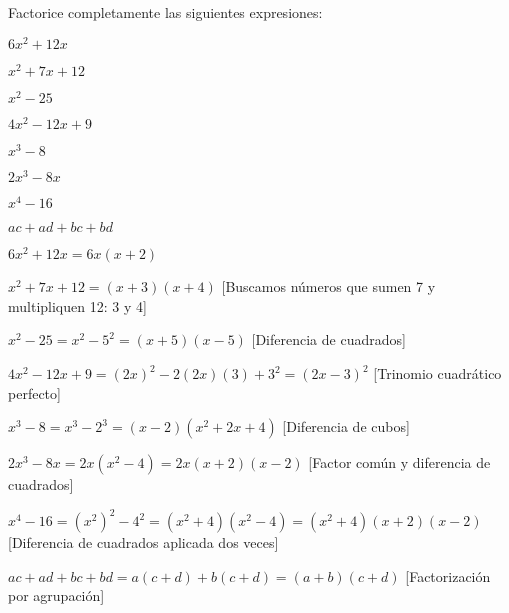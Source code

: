 \begin{exercise}
\problem Factorice completamente las siguientes expresiones:

\begin{exerciselist}
    \item $6x^2 + 12x$
    \item $x^2 + 7x + 12$
    \item $x^2 - 25$
    \item $4x^2 - 12x + 9$
    \item $x^3 - 8$
    \item $2x^3 - 8x$
    \item $x^4 - 16$
    \item $ac + ad + bc + bd$
\end{exerciselist}

\begin{solucion}
\begin{exerciselist}
    \item $6x^2 + 12x = 6x(x + 2)$
    
    \item $x^2 + 7x + 12 = (x + 3)(x + 4)$ [Buscamos números que sumen 7 y multipliquen 12: 3 y 4]
    
    \item $x^2 - 25 = x^2 - 5^2 = (x + 5)(x - 5)$ [Diferencia de cuadrados]
    
    \item $4x^2 - 12x + 9 = (2x)^2 - 2(2x)(3) + 3^2 = (2x - 3)^2$ [Trinomio cuadrático perfecto]
    
    \item $x^3 - 8 = x^3 - 2^3 = (x - 2)(x^2 + 2x + 4)$ [Diferencia de cubos]
    
    \item $2x^3 - 8x = 2x(x^2 - 4) = 2x(x + 2)(x - 2)$ [Factor común y diferencia de cuadrados]
    
    \item $x^4 - 16 = (x^2)^2 - 4^2 = (x^2 + 4)(x^2 - 4) = (x^2 + 4)(x + 2)(x - 2)$ [Diferencia de cuadrados aplicada dos veces]
    
    \item $ac + ad + bc + bd = a(c + d) + b(c + d) = (a + b)(c + d)$ [Factorización por agrupación]
\end{exerciselist}
\end{solucion}
\end{exercise}

